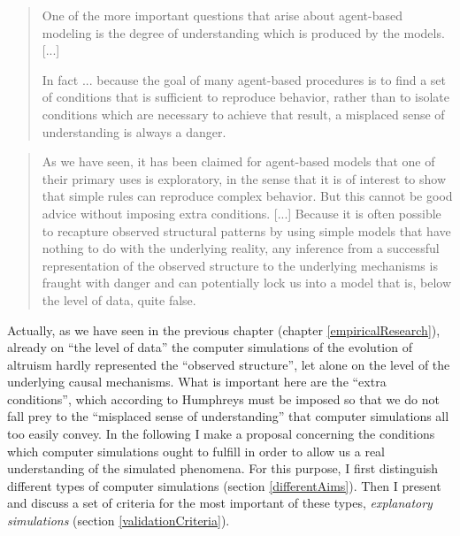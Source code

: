 \begin{quotation}
  One of the more important questions that arise about agent-based modeling is
  the degree of understanding which is produced by the models. [...]

  In fact ... because the goal of many agent-based procedures is to find a set
  of conditions that is sufficient to reproduce behavior, rather than to
  isolate conditions which are necessary to achieve that result, a misplaced
  sense of understanding is always a danger. \cite[p. 132]{humphreys:2004}
\end{quotation}

\begin{quotation}
  As we have seen, it has been claimed for agent-based models that one of
  their primary uses is exploratory, in the sense that it is of interest to
  show that simple rules can reproduce complex behavior. But this cannot be
  good advice without imposing extra conditions. [...] Because it is often
  possible to recapture observed structural patterns by using simple models
  that have nothing to do with the underlying reality, any inference from a
  successful representation of the observed structure to the underlying
  mechanisms is fraught with danger and can potentially lock us into a model
  that is, below the level of data, quite false. \cite[p. 134]{humphreys:2004}
\end{quotation}

Actually, as we have seen in the previous chapter (chapter
\ref{empiricalResearch}), already on ``the level of data'' the computer
simulations of the evolution of altruism hardly represented the ``observed
structure'', let alone on the level of the underlying causal mechanisms. What
is important here are the ``extra conditions'', which according to Humphreys
must be imposed so that we do not fall prey to the ``misplaced sense of
understanding'' that computer simulations all too easily convey. In the
following I make a proposal concerning the conditions which computer
simulations ought to fulfill in order
to allow us a real understanding of the simulated phenomena. For this purpose,
I first distinguish different types of computer simulations (section
\ref{differentAims}). Then I present and discuss a set of criteria for
the most important of these types, {\em explanatory simulations} (section
\ref{validationCriteria}).


